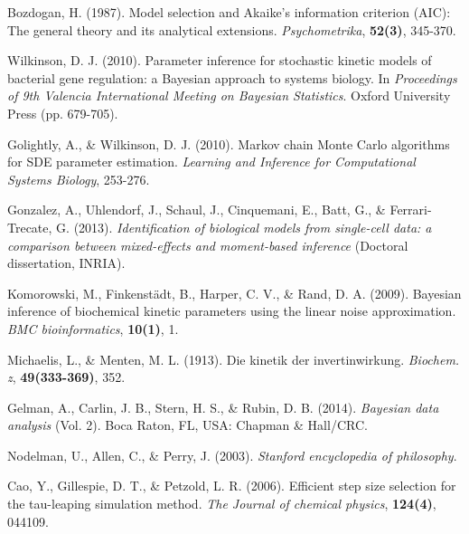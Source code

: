 \documentclass{bioinfo}
\begin{document}
\begin{thebibliography}{}
Bozdogan, H. (1987). Model selection and Akaike's information criterion (AIC): The general theory and its analytical extensions. \textit{Psychometrika}, \textbf{52(3)}, 345-370.

Wilkinson, D. J. (2010). Parameter inference for stochastic kinetic models of bacterial gene regulation: a Bayesian approach to systems biology. In \textit{Proceedings of 9th Valencia International Meeting on Bayesian Statistics}. Oxford University Press (pp. 679-705).

Golightly, A., \& Wilkinson, D. J. (2010). Markov chain Monte Carlo algorithms for SDE parameter estimation. \textit{Learning and Inference for Computational Systems Biology}, 253-276.

Gonzalez, A., Uhlendorf, J., Schaul, J., Cinquemani, E., Batt, G., \& Ferrari-Trecate, G. (2013). \textit{Identification of biological models from single-cell data: a comparison between mixed-effects and moment-based inference} (Doctoral dissertation, INRIA).

Komorowski, M., Finkenst\"adt, B., Harper, C. V., \& Rand, D. A. (2009). Bayesian inference of biochemical kinetic parameters using the linear noise approximation. \textit{BMC bioinformatics}, \textbf{10(1)}, 1.

Michaelis, L., \& Menten, M. L. (1913). Die kinetik der invertinwirkung. \textit{Biochem. z}, \textbf{49(333-369)}, 352.

Gelman, A., Carlin, J. B., Stern, H. S., \& Rubin, D. B. (2014). \textit{Bayesian data analysis} (Vol. 2). Boca Raton, FL, USA: Chapman \& Hall/CRC.

Nodelman, U., Allen, C., \& Perry, J. (2003). \textit{Stanford encyclopedia of philosophy}.

Cao, Y., Gillespie, D. T., \& Petzold, L. R. (2006). Efficient step size selection for the tau-leaping simulation method. \textit{The Journal of chemical physics}, \textbf{124(4)}, 044109.

\end{thebibliography}
\end{document}
